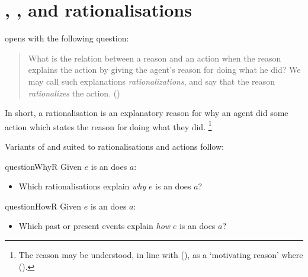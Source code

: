 \chapter{\qWhy{}, \qHow{}, and rationalisations}
\label{sec:reasons}


\begin{note}
  \citeauthor{Davidson:1963aa} opens  with the following question:
  \begin{quote}
    What is the relation between a reason and an action when the reason explains the action by giving the agent's reason for doing what he did?
    We may call such explanations \emph{rationalizations}, and say that the reason \emph{rationalizes} the action.%
    \mbox{}\hfill\mbox{(\citeyear[685]{Davidson:1963aa})}
  \end{quote}
  In short, a rationalisation is an explanatory reason for why an agent did some action which states the \agents{} reason for doing what they did.%
  \footnote{
    The \agents{} reason may be understood, in line with \citeauthor{Smith:1994wo} (\citeyear{Smith:1994wo}), as a `motivating reason' where
    (\citeyear[96]{Smith:1994wo}).
  }

  Variants of \qWhy{} and \qHow{} suited to rationalisations and actions follow:

  \begin{question}{questionWhyR}{\qWhyR{}}
    Given \(e\) is an  \vAgent{} does \(a\):

    \begin{itemize}
    \item
      Which rationalisations explain \emph{why} \(e\) is an  \vAgent{} does \(a\)?
    \end{itemize}
    \vspace{-1.5\baselineskip}
  \end{question}

  \begin{question}{questionHowR}{\qHowR{}}
    Given \(e\) is an  \vAgent{} does \(a\):

    \begin{itemize}
    \item
      Which past or present events explain \emph{how} \(e\) is an  \vAgent{} does \(a\)?
    \end{itemize}
    \vspace{-1.5\baselineskip}
  \end{question}


\end{note}
